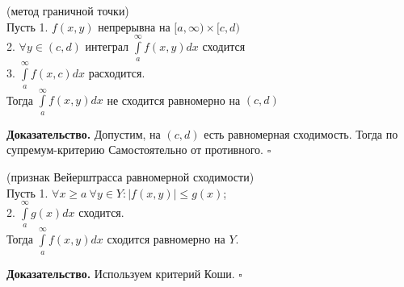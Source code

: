 \begin{theor}
    (метод граничной точки)\\
    Пусть 1. $f(x,y)$ непрерывна на $[a,\infty)\times[c,d)$\\
    2. $\forall y\in (c,d)$ интеграл $\int\limits_{a}^{\infty} f(x,y)dx$ 
    сходится \\
    3. $\int\limits_{a}^{\infty}f(x,c)dx$ расходится.\\
    Тогда $\int\limits_{a}^{\infty}f(x,y)dx$ не сходится равномерно на 
    $(c,d)$
\end{theor}
\textbf{Доказательство.} Допустим, на $(c,d)$ есть равномерная сходимость.
Тогда по супремум-критерию
Самостоятельно от противного. 
$\square$ 

\begin{theor}
    (признак Вейерштрасса равномерной сходимости)\\
    Пусть 1. $\forall x\geqslant a~\forall y\in Y:|f(x,y)|\leqslant g(x)$;\\
    2. $\int\limits_{a}^{\infty}g(x)dx$ сходится.\\
Тогда $\int\limits_{a}^{\infty}f(x,y)dx$ сходится равномерно на  $Y$.
\end{theor}
\textbf{Доказательство.}  Используем критерий Коши. 
$\square$ \\


